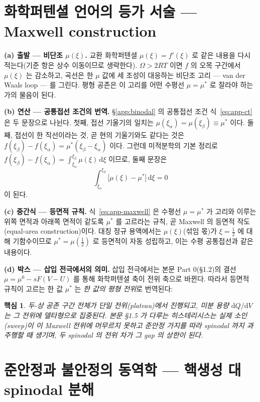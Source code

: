 \documentclass[11pt,a4paper]{article}
\newtheorem*{keybox}{핵심}
\newcommand{\dd}{\mathrm{d}}
\begin{document}
\section{화학퍼텐셜 언어의 등가 서술 --- Maxwell construction}\label{app:maxwell}

\textbf{(a) 출발 --- 비단조 $\mu(\xi)$.} 교환 화학퍼텐셜 $\mu(\xi)=f'(\xi)$ 로 같은 내용을 다시
적는다(기준 항은 상수 이동이므로 생략한다). $\Omega>2RT$ 이면 $f$ 의 오목 구간에서 $\mu(\xi)$ 는
감소하고, 곡선은 한 $\mu$ 값에 세 조성이 대응하는 비단조 고리 --- van der Waals loop --- 를 그린다.
평형 공존은 이 고리를 어떤 수평선 $\mu=\mu^\ast$ 로 잘라야 하는가의 물음이 된다.

\textbf{(b) 연산 --- 공통접선 조건의 번역.} \S\ref{app:binodal} 의 공통접선 조건
식~\eqref{eq:app-ct} 은 두 문장으로 나뉜다. 첫째, 접선 기울기의 일치는
$\mu(\xi_\alpha)=\mu(\xi_\beta)\equiv\mu^\ast$ 이다. 둘째, 접선이 한 직선이라는 것, 곧 현의 기울기와도
같다는 것은 $f(\xi_\beta)-f(\xi_\alpha)=\mu^\ast(\xi_\beta-\xi_\alpha)$ 이다. 그런데 미적분학의 기본
정리로 $f(\xi_\beta)-f(\xi_\alpha)=\int_{\xi_\alpha}^{\xi_\beta}\mu(\xi)\,\dd\xi$ 이므로, 둘째 문장은
\begin{equation}
\int_{\xi_\alpha}^{\xi_\beta}\bigl[\mu(\xi)-\mu^\ast\bigr]\,\dd\xi=0
\label{eq:app-maxwell}
\end{equation}
이 된다.

\textbf{(c) 중간식 --- 등면적 규칙.} 식~\eqref{eq:app-maxwell} 은 수평선 $\mu=\mu^\ast$ 가 고리와
이루는 위쪽 면적과 아래쪽 면적이 같도록 $\mu^\ast$ 를 고르라는 규칙, 곧 Maxwell 의 등면적
작도(equal-area construction)이다. 대칭 정규 용액에서는 $\mu(\xi)$(섞임 몫)가 $\xi=\tfrac12$ 에 대해
기함수이므로 $\mu^\ast=\mu(\tfrac12)$ 로 등면적이 자동 성립하고, 이는 수평 공통접선과 같은 내용이다.

\textbf{(d) 박스 --- 삽입 전극에서의 의미.} 삽입 전극에서는 본문 Part 0(\S1.2)의 결선
$\mu=\mu^0-sF(V-U)$ 를 통해 화학퍼텐셜 축이 전위 축으로 바뀐다. 따라서 등면적 규칙이 고르는 한 값
$\mu^\ast$ 는 \emph{한 값의 평형 전위}로 번역된다:
\begin{keybox}
두-상 공존 구간 전체가 단일 전위(plateau)에서 진행되고, 미분 용량 $\dd Q/\dd V$ 는 그 전위에
델타형으로 집중된다. 본문 \S1.5 가 다루는 히스테리시스는 실제 소인(sweep)이 이 Maxwell 전위에
머무르지 못하고 준안정 가지를 따라 spinodal 까지 과주행할 때 생기며, 두 spinodal 의 전위 차가 그
gap 의 상한이 된다.
\end{keybox}

\section{준안정과 불안정의 동역학 --- 핵생성 대 spinodal 분해}\label{app:kinetics}
\end{document}

